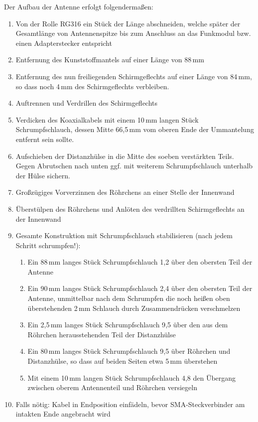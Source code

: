 \documentclass[pdftex, parskip, numbers=noenddot, toc=listof]{scrbook}
\begin{document}
	Der Aufbau der Antenne erfolgt folgendermaßen:
	\begin{enumerate}
		\item Von der Rolle RG316 ein Stück der Länge abschneiden, welche später der Gesamtlänge von Antennenspitze bis zum Anschluss an das Funkmodul bzw. einen Adapterstecker entspricht
		\item Entfernung des Kunststoffmantels auf einer Länge von 88\,mm
		\item Entfernung des nun freiliegenden Schirmgeflechts auf einer Länge von 84\,mm, so dass noch 4\,mm des Schirmgeflechts verbleiben.
		\item Auftrennen und Verdrillen des Schirmgeflechts
		\item Verdicken des Koaxialkabels mit einem 10\,mm langen Stück Schrumpfschlauch, dessen Mitte 66{,}5\,mm vom oberen Ende der Ummantelung entfernt sein sollte.
		\item Aufschieben der Distanzhülse in die Mitte des soeben verstärkten Teils. Gegen Abrutschen nach unten ggf. mit weiterem Schrumpfschlauch unterhalb der Hülse sichern.
		\item Großzügiges Vorverzinnen des Röhrchens an einer Stelle der Innenwand
		\item Überstülpen des Röhrchens und Anlöten des verdrillten Schirmgeflechts an der Innenwand
		\item Gesamte Konstruktion mit Schrumpfschlauch stabilisieren (nach jedem Schritt schrumpfen!):
		      \begin{enumerate}
		      	\item Ein 88\,mm langes Stück Schrumpfschlauch 1{,}2 über den obersten Teil der Antenne
		      	\item Ein 90\,mm langes Stück Schrumpfschlauch 2{,}4 über den obersten Teil der Antenne, unmittelbar nach dem Schrumpfen die noch heißen oben überstehenden 2\,mm Schlauch durch Zusammendrücken verschmelzen
		      	\item Ein 2{,}5\,mm langes Stück Schrumpfschlauch 9{,}5 über den aus dem Röhrchen herausstehenden Teil der Distanzhülse
		      	\item Ein 80\,mm langes Stück Schrumpfschlauch 9{,}5 über Röhrchen und Distanzhülse, so dass auf beiden Seiten etwa 5\,mm überstehen
		      	\item Mit einem 10\,mm langen Stück Schrumpfschlauch 4{,}8 den Übergang zwischen oberem Antennenteil und Röhrchen versiegeln
		      \end{enumerate}
		\item Falls nötig: Kabel in Endposition einfädeln, bevor SMA-Steckverbinder am intakten Ende angebracht wird
	\end{enumerate}
\end{document}

